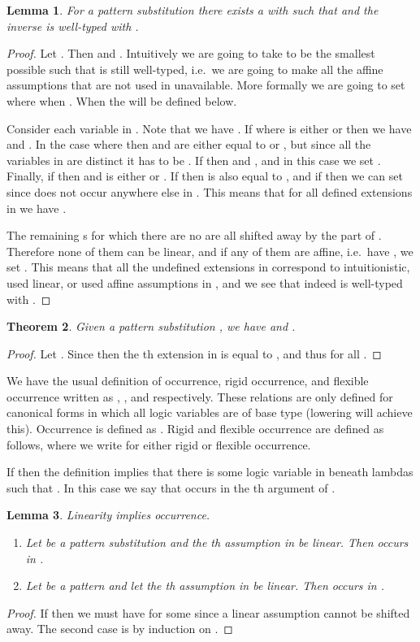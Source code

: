 \documentclass{eptcs}
\newtheorem{thm}{Theorem}[section]
\newtheorem{lem}[thm]{Lemma}
\theoremstyle{definition}
\begin{document}
\begin{lem}
For a pattern substitution  there exists a
 with  such that
 and the inverse is well-typed with
.
\end{lem}
\begin{proof}
Let .
Then 
and .  Intuitively we are
going to take  to be the smallest possible such that  is
still well-typed, i.e.\ we are going to make all the affine assumptions
that are not used in  unavailable.  More formally we are going to set
 where 
when .  When  the  will
be defined below.

Consider each variable  in .
Note that we have .
If  where  is either  or  then we have
 and .
In the case where  then  and 
are either equal to  or , but since all the variables in 
are distinct it has to be .
If  then  and , and in this case we set
.
Finally, if  then  and  is either  or
.  If  then  is also equal to , and if
 then we can set  since  does not occur
anywhere else in .  This means that for all defined extensions
 in  we have .

The remaining s for which there are no  are
all shifted away by the  part of .  Therefore none of them
can be linear, and if any of them are affine, i.e.\ have ,
we set .
This means that all the undefined extensions in  correspond to
intuitionistic, used linear, or used affine assumptions in ,
and we see that 
 indeed is well-typed with .
\end{proof}
\begin{thm}\label{thm:inverse}
Given a pattern substitution , we have
 and
.
\end{thm}
\begin{proof}
Let .
Since  then the th extension in  is equal to
, and thus  for all .
\end{proof}

We have the usual definition of occurrence, rigid occurrence, and flexible
occurrence written as , , and 
respectively.  These relations are only defined for canonical forms in
which all logic variables are of base type (lowering will achieve this).
Occurrence is defined as
.  Rigid and flexible
occurrence are defined as follows, where we write  for either
rigid or flexible occurrence.


If  then the definition implies that there is
some logic variable \mbox{} in
 beneath  lambdas such that
.  In this case we say that
 occurs in the th argument of .

\begin{lem}\label{lem:linoccur}
Linearity implies occurrence.
\begin{enumerate}
\item
Let  be a pattern substitution and the th
assumption in  be linear.  Then  occurs in .
\item
Let  be a pattern and let the th
assumption in  be linear.  Then  occurs in .
\end{enumerate}
\end{lem}
\begin{proof}
If  then we must have
 for some  since a linear assumption cannot be shifted away.
The second case is by induction on .
\end{proof}
\end{document}
